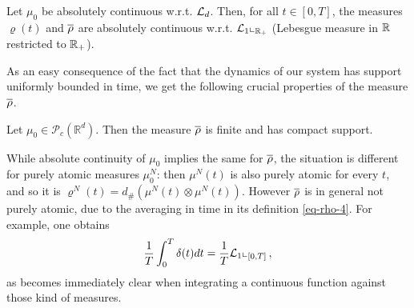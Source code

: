 %


\begin{lemma}\label{le-abs}
	Let $\mu_0$ be absolutely continuous w.r.t. $\mathcal{L}_d$. Then, for all $t\in [0,T]$, the measures $\varrho(t)$ and $\overline\rho$ are absolutely
	continuous w.r.t. $\mathcal{L}_1\llcorner_{\mathbb{R}_+}$ (Lebesgue measure in $\mathbb{R}$ restricted to $\mathbb{R}_+$).
\end{lemma}

As an easy consequence of the fact that the dynamics of our system has support uniformly bounded in time, we get the following crucial properties of the measure $\overline\rho$.

\begin{lemma}\label{rhocompact} Let $\mu_0 \in \mathcal P_c(\mathbb R^d)$. Then
	the measure $\overline\rho$ is finite and has compact support.
\end{lemma}

\begin{remark}
	While absolute continuity of $\mu_0$ implies the same for $\overline\rho$, the situation is different for purely atomic
	measures $\mu_0^N$: then $\mu^N(t)$ is also purely atomic for every $t$, and so it is
	$\varrho^N(t) = d_\# (\mu^N(t) \otimes \mu^N(t))$. However $\overline\rho$ is in general not purely atomic, due to the averaging in time in its definition \eqref{eq-rho-4}. 
	For
	example, one obtains
	\begin{align*}
		\frac{1}{T}\int_0^T\delta(t) dt=\frac{1}{T}\mathcal{L}_1\llcorner_{[0,T]}\,,
	\end{align*}
	as becomes immediately clear when integrating a continuous function against those kind of measures.
\end{remark}


